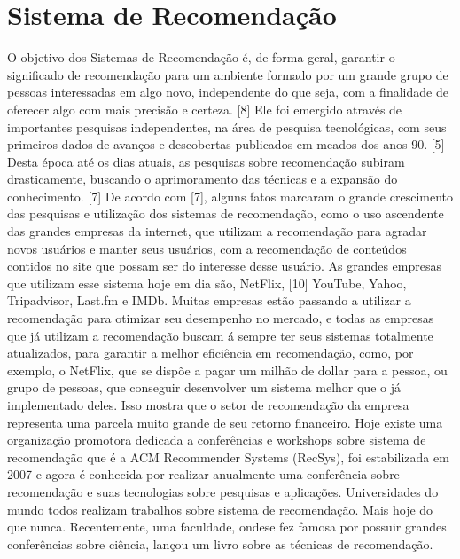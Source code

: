 \documentclass[12pt,
				openright,
				twoside,
				a4paper,
				apter=TITLE,
				section=TITLE,
				subsection=TITLE,
				chapter=TITLE,
				english,
				brazil]{abntex2}
\begin{document}
\chapter{Sistema de Recomendação}
O objetivo dos Sistemas de Recomendação é, de forma geral, garantir o significado de recomendação para um ambiente formado por um grande grupo de pessoas interessadas em algo novo, independente do que seja, com a finalidade de oferecer algo com mais precisão e certeza. [8] Ele foi emergido através de importantes pesquisas independentes, na área de pesquisa tecnológicas, com seus primeiros dados de avanços e descobertas publicados em meados dos anos 90. [5] Desta época até os dias atuais, as pesquisas sobre recomendação subiram drasticamente, buscando o aprimoramento das técnicas e a expansão do conhecimento. [7] 
De acordo com [7], alguns fatos marcaram o grande crescimento das pesquisas e utilização dos sistemas de recomendação, como o uso ascendente das grandes empresas da internet, que utilizam a recomendação para agradar novos usuários e manter seus usuários, com a recomendação de conteúdos contidos no site que possam ser do interesse desse usuário. As grandes empresas que utilizam esse sistema hoje em dia são, NetFlix, [10] YouTube, Yahoo, Tripadvisor, Last.fm e IMDb. Muitas empresas estão passando a utilizar a recomendação para otimizar seu desempenho no mercado, e todas as empresas que já utilizam a recomendação buscam á sempre ter seus sistemas totalmente atualizados, para garantir a melhor eficiência em recomendação, como, por exemplo, o NetFlix, que se dispõe a pagar um milhão de dollar para a pessoa, ou grupo de pessoas, que conseguir desenvolver um sistema melhor que o já implementado deles. Isso mostra que o setor de recomendação da empresa representa uma parcela muito grande de seu retorno financeiro. 
Hoje existe uma organização promotora dedicada a conferências e workshops sobre sistema de recomendação que é a ACM Recommender Systems (RecSys), foi estabilizada em 2007 e agora é conhecida por realizar anualmente uma conferência sobre recomendação e suas tecnologias sobre pesquisas e aplicações.
Universidades do mundo todos realizam trabalhos sobre sistema de recomendação. Mais hoje do que nunca. Recentemente, uma faculdade, ondese fez famosa por possuir grandes conferências sobre ciência, lançou um livro sobre as técnicas de recomendação.
\end{document}
